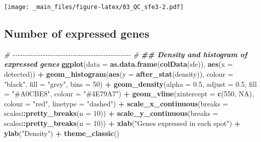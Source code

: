 \documentclass[
]{book}
\newenvironment{Shaded}{\begin{snugshade}}{\end{snugshade}}
\newcommand{\AttributeTok}[1]{\textcolor[rgb]{0.13,0.29,0.53}{#1}}
\newcommand{\CommentTok}[1]{\textcolor[rgb]{0.56,0.35,0.01}{\textit{#1}}}
\newcommand{\ConstantTok}[1]{\textcolor[rgb]{0.56,0.35,0.01}{#1}}
\newcommand{\DecValTok}[1]{\textcolor[rgb]{0.00,0.00,0.81}{#1}}
\newcommand{\DocumentationTok}[1]{\textcolor[rgb]{0.56,0.35,0.01}{\textbf{\textit{#1}}}}
\newcommand{\FloatTok}[1]{\textcolor[rgb]{0.00,0.00,0.81}{#1}}
\newcommand{\FunctionTok}[1]{\textcolor[rgb]{0.13,0.29,0.53}{\textbf{#1}}}
\newcommand{\NormalTok}[1]{#1}
\newcommand{\SpecialCharTok}[1]{\textcolor[rgb]{0.81,0.36,0.00}{\textbf{#1}}}
\newcommand{\StringTok}[1]{\textcolor[rgb]{0.31,0.60,0.02}{#1}}
\begin{document}
\texttt{[image: \_main\_files/figure-latex/03\_QC\_sfe3-2.pdf]}

\hypertarget{number-of-expressed-genes-1}{%
\subsection{Number of expressed genes}\label{number-of-expressed-genes-1}}

\begin{Shaded}
\begin{Highlighting}[]
\CommentTok{\# {-}{-}{-}{-}{-}{-}{-}{-}{-}{-}{-}{-}{-}{-}{-}{-}{-}{-}{-}{-}{-}{-}{-}{-}{-}{-}{-}{-}{-}{-}{-}{-}{-}{-}{-}{-}{-}{-}{-}{-}{-}{-}{-}{-}{-}{-}{-} \#}
\DocumentationTok{\#\# Density and histogram of expressed genes}
\FunctionTok{ggplot}\NormalTok{(}\AttributeTok{data =} \FunctionTok{as.data.frame}\NormalTok{(}\FunctionTok{colData}\NormalTok{(sfe)),}
       \FunctionTok{aes}\NormalTok{(}\AttributeTok{x =}\NormalTok{ detected)) }\SpecialCharTok{+}
    \FunctionTok{geom\_histogram}\NormalTok{(}\FunctionTok{aes}\NormalTok{(}\AttributeTok{y =} \FunctionTok{after\_stat}\NormalTok{(density)), }
                   \AttributeTok{colour =} \StringTok{"black"}\NormalTok{, }
                   \AttributeTok{fill =} \StringTok{"grey"}\NormalTok{,}
                   \AttributeTok{bins =} \DecValTok{50}\NormalTok{) }\SpecialCharTok{+}
    \FunctionTok{geom\_density}\NormalTok{(}\AttributeTok{alpha =} \FloatTok{0.5}\NormalTok{,}
                 \AttributeTok{adjust =} \FloatTok{0.5}\NormalTok{,}
                 \AttributeTok{fill =} \StringTok{"\#A0CBE8"}\NormalTok{,}
                 \AttributeTok{colour =} \StringTok{"\#4E79A7"}\NormalTok{) }\SpecialCharTok{+} 
    \FunctionTok{geom\_vline}\NormalTok{(}\AttributeTok{xintercept =} \FunctionTok{c}\NormalTok{(}\DecValTok{550}\NormalTok{, }\ConstantTok{NA}\NormalTok{),}
               \AttributeTok{colour =} \StringTok{"red"}\NormalTok{, }
               \AttributeTok{linetype =} \StringTok{"dashed"}\NormalTok{) }\SpecialCharTok{+}
    \FunctionTok{scale\_x\_continuous}\NormalTok{(}\AttributeTok{breaks =}\NormalTok{ scales}\SpecialCharTok{::}\FunctionTok{pretty\_breaks}\NormalTok{(}\AttributeTok{n =} \DecValTok{10}\NormalTok{)) }\SpecialCharTok{+} 
    \FunctionTok{scale\_y\_continuous}\NormalTok{(}\AttributeTok{breaks =}\NormalTok{ scales}\SpecialCharTok{::}\FunctionTok{pretty\_breaks}\NormalTok{(}\AttributeTok{n =} \DecValTok{10}\NormalTok{)) }\SpecialCharTok{+} 
    \FunctionTok{xlab}\NormalTok{(}\StringTok{"Genes expressed in each spot"}\NormalTok{) }\SpecialCharTok{+} 
    \FunctionTok{ylab}\NormalTok{(}\StringTok{"Density"}\NormalTok{) }\SpecialCharTok{+} 
    \FunctionTok{theme\_classic}\NormalTok{()}
\end{Highlighting}
\end{Shaded}
\end{document}
